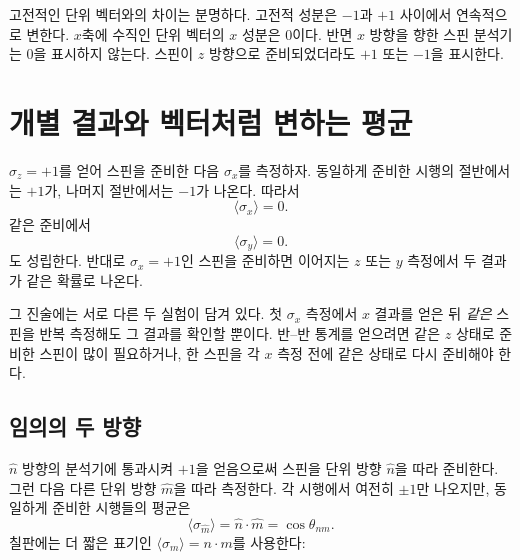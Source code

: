 고전적인 단위 벡터와의 차이는 분명하다. 고전적 성분은 \(-1\)과 \(+1\) 사이에서 연속적으로 변한다. \(x\)축에 수직인 단위 벡터의 \(x\) 성분은 0이다. 반면 \(x\) 방향을 향한 스핀 분석기는 0을 표시하지 않는다. 스핀이 \(z\) 방향으로 준비되었더라도 \(+1\) 또는 \(-1\)을 표시한다.

\section{개별 결과와 벡터처럼 변하는 평균}

\(\sigma_z=+1\)를 얻어 스핀을 준비한 다음 \(\sigma_x\)를 측정하자. 동일하게 준비한 시행의 절반에서는 \(+1\)가, 나머지 절반에서는 \(-1\)가 나온다. 따라서
\begin{equation}
\langle \sigma_x\rangle=0.
\end{equation}
같은 준비에서
\begin{equation}
\langle \sigma_y\rangle=0.
\end{equation}
도 성립한다. 반대로 \(\sigma_x=+1\)인 스핀을 준비하면 이어지는 \(z\) 또는 \(y\) 측정에서 두 결과가 같은 확률로 나온다.

그 진술에는 서로 다른 두 실험이 담겨 있다. 첫 \(\sigma_x\) 측정에서 \(x\) 결과를 얻은 뒤 \emph{같은} 스핀을 반복 측정해도 그 결과를 확인할 뿐이다. 반--반 통계를 얻으려면 같은 \(z\) 상태로 준비한 스핀이 많이 필요하거나, 한 스핀을 각 \(x\) 측정 전에 같은 상태로 다시 준비해야 한다.

\begin{classroomqa}
\end{classroomqa}

\subsection{임의의 두 방향}

\(\hat n\) 방향의 분석기에 통과시켜 \(+1\)을 얻음으로써 스핀을 단위 방향 \(\hat n\)을 따라 준비한다. 그런 다음 다른 단위 방향 \(\hat m\)을 따라 측정한다. 각 시행에서 여전히 \(\pm1\)만 나오지만, 동일하게 준비한 시행들의 평균은
\begin{equation}
\boxed{\langle\sigma_{\hat m}\rangle=\hat n\cdot\hat m
=\cos\theta_{nm}.}
\label{eq:spin-average}
\end{equation}
칠판에는 더 짧은 표기인 \(\langle\sigma_m\rangle=n\cdot m\)를 사용한다:

